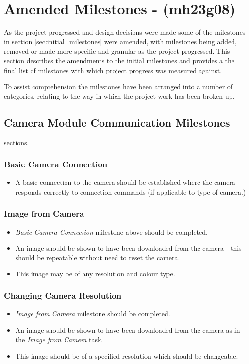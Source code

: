 
\section{Amended Milestones - (mh23g08)}
As the project progressed and design decisions were made some of the milestones in section
\ref{sec:initial_milestones} were amended, with milestones being added, removed or made more
specific and granular as the project progressed. This section describes the amendments to the
initial milestones and provides a the final list of milestones with which project progress was measured
against.

To assist comprehension the milestones have been arranged into a number of categories,
relating to the way in which the project work has been broken up. 

\subsection{Camera Module Communication Milestones}
sections. 
	\subsubsection{Basic Camera Connection}
		\begin{itemize}
			\item 	A basic connection to the camera should be established
				where the camera responds correctly to connection 
				commands (if applicable to type of camera.)
		\end{itemize}

	\subsubsection{Image from Camera}
		\begin{itemize}
			\item 	\emph{Basic Camera Connection} milestone above should
				be completed.
			\item 	An image should be shown to have been downloaded 
				from the camera - this should be repeatable without
				need to reset the camera.
			\item 	This image may be of any resolution and colour type.
		\end{itemize} 

	\subsubsection{Changing Camera Resolution}
		\begin{itemize}
			\item \emph{Image from Camera} milestone should be completed.
			\item 	An image should be shown to have been downloaded 
				from the camera as in the \emph{Image from Camera}
				task.
			\item 	This image should be of a specified resolution which
				should be changeable.
		\end{itemize}


